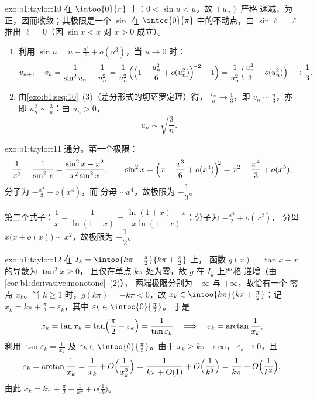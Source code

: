 \begin{solution}{exo:b1:taylor:10}
在 $\intoo{0}{\pi}$ 上：$0 < \sin u < u$，故 $(u_n)$ 严格
递减、为正，因而收敛；其极限是一个
$\sin$ 在 $\intcc{0}{\pi}$ 中的不动点，由 $\sin \ell = \ell$ 推出 $\ell =
0$（因 $\sin x < x$ 对 $x > 0$ 成立）。
\begin{enumerate}
  \item 利用 $\sin u = u - \frac{u^3}{6} + o(u^3)$，当 $u \to 0$ 时：
        \[
        v_{n+1} - v_n = \frac{1}{\sin^2 u_n} - \frac{1}{u_n^2}
        = \frac{1}{u_n^2}\Bigl(\Bigl(1 - \frac{u_n^2}{6} +
        o(u_n^2)\Bigr)^{\!-2} - 1\Bigr)
        = \frac{1}{u_n^2}\Bigl(\frac{u_n^2}{3} + o(u_n^2)\Bigr)
        \longrightarrow \frac13 .
        \]
  \item 由\cref{exo:b1:seq:10}~(3)（差分形式的切萨罗定理）得，
        $\frac{v_n}{n} \to \frac13$，即 $v_n \sim \frac n3$，亦即
        $u_n^2 \sim \frac 3n$：由 $u_n > 0$，
        \[
        u_n \sim \sqrt{\frac{3}{n}} .
        \]
\end{enumerate}
\end{solution}

\begin{solution}{exo:b1:taylor:11}
通分。第一个极限：
\[
\frac{1}{x^2} - \frac{1}{\sin^2 x}
= \frac{\sin^2 x - x^2}{x^2\sin^2 x},
\qquad
\sin^2 x = \Bigl(x - \frac{x^3}{6} + o(x^4)\Bigr)^{\!2}
= x^2 - \frac{x^4}{3} + o(x^5) ,
\]
分子为 $-\frac{x^4}{3} + o(x^4)$，而
分母 $\sim x^4$，故极限为 $-\dfrac13$。

第二个式子：$\dfrac1x - \dfrac{1}{\ln(1+x)} = \dfrac{\ln(1+x) -
x}{x\ln(1+x)}$；分子为 $-\frac{x^2}{2} + o(x^2)$，
分母 $x\bigl(x + o(x)\bigr) \sim x^2$，故极限为
$-\dfrac12$。
\end{solution}

\begin{solution}{exo:b1:taylor:12}
在 $I_k = \intoo{k\pi - \frac\pi2}{k\pi + \frac\pi2}$ 上，
函数 $g(x) = \tan x - x$ 的导数为 $\tan^2 x \geq 0$，
且仅在单点 $k\pi$ 处为零，故 $g$ 在 $I_k$ 上严格
递增（由\cref{cor:b1:derivative:monotone}~(2)），
两端极限分别为 $-\infty$ 与 $+\infty$，故恰有一个
零点 $x_k$。当 $k \geq 1$ 时，$g(k\pi) = -k\pi < 0$，故 $x_k \in
\intoo{k\pi}{k\pi + \frac\pi2}$：记 $x_k = k\pi + \frac\pi2 -
\varepsilon_k$，其中 $\varepsilon_k \in \intoo{0}{\frac\pi2}$。
于是
\[
x_k = \tan x_k = \tan\Bigl(\frac\pi2 - \varepsilon_k\Bigr)
= \frac{1}{\tan\varepsilon_k}
\quad\Longrightarrow\quad
\varepsilon_k = \arctan\frac{1}{x_k} ,
\]
利用 $\tan\varepsilon_k = \frac{1}{x_k}$ 及 $\varepsilon_k \in
\intoo{0}{\frac\pi2}$。由于 $x_k \geq k\pi \to \infty$，
$\varepsilon_k \to 0$，且
\[
\varepsilon_k = \arctan\frac{1}{x_k} = \frac{1}{x_k} +
O\Bigl(\frac{1}{x_k^3}\Bigr)
= \frac{1}{k\pi + O(1)} + O\Bigl(\frac{1}{k^3}\Bigr)
= \frac{1}{k\pi} + O\Bigl(\frac{1}{k^2}\Bigr) ,
\]
由此 $x_k = k\pi + \frac\pi2 - \frac{1}{k\pi} +
o\bigl(\frac1k\bigr)$。
\end{solution}

